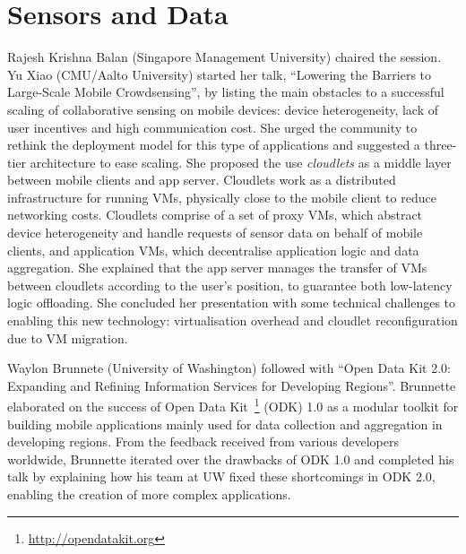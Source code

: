 \section{Sensors and Data}
\label{sec:sensors}

Rajesh Krishna Balan (Singapore Management University) chaired the
session. Yu Xiao (CMU/Aalto University) started her talk, ``Lowering the
Barriers to Large-Scale Mobile Crowdsensing'', by listing the main
obstacles to a successful scaling of collaborative sensing on mobile devices:
device heterogeneity, lack of user incentives and high communication
cost. She urged the community to rethink the deployment model for this
type of applications and suggested a three-tier architecture to ease
scaling. She proposed the use \emph{cloudlets} as a middle layer between
mobile clients and app server. Cloudlets work as a
distributed infrastructure for running VMs, physically close to the
mobile client to reduce networking costs. Cloudlets comprise of a set of
proxy VMs, which abstract device heterogeneity and handle requests of
sensor data on behalf of mobile clients, and application VMs, which
decentralise application logic and data aggregation. She explained that
the app server manages the transfer of VMs between cloudlets according
to the user's position, to guarantee both low-latency logic
offloading. She concluded her presentation with some technical
challenges to enabling this new technology: virtualisation overhead and
cloudlet reconfiguration due to VM migration.

Waylon Brunnete (University of Washington) followed with ``Open Data Kit
2.0: Expanding and Refining Information Services for Developing
Regions''. Brunnette elaborated on the success of Open Data
Kit~\footnote{\url{http://opendatakit.org}} (ODK) 1.0 as a modular
toolkit for building mobile applications mainly used for data collection
and aggregation in developing regions. From the feedback received from
various developers worldwide, Brunnette iterated over the drawbacks of
ODK 1.0 and completed his talk by explaining how his team at UW fixed
these shortcomings in ODK 2.0, enabling the creation of more complex
applications.


